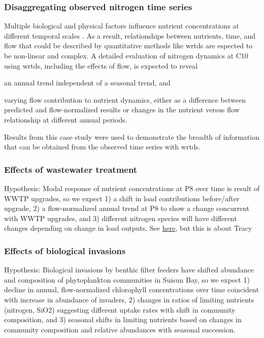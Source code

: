\documentclass[letterpaper,12pt,oneside]{article}\usepackage[]{graphicx}\usepackage[]{color}
\begin{document}
\subsubsection{Disaggregating observed nitrogen time series}

Multiple biological and physical factors influence nutrient concentrations at different temporal scales \citep[][, references therein]{Cloern10}.  As a result, relationships between nutrients, time, and flow that could be described by quantitative methods like \ac{wrtds} are espected to be non-linear and complex.  A detailed evaluation of nitrogen dynamics at C10 using \ac{wrtds}, including the effects of flow, is expected to reveal \begin{inparaenum}[1\upshape)]
\item an annual trend independent of a seasonal trend, and 
\item varying flow contribution to nutrient dynamics, either as a difference between predicted and flow-normalized results or changes in the nutrient versus flow relationship at different annual periods.
\end{inparaenum}
Results from this case study were used to demonstrate the breadth of information that can be obtained from the observed time series with \ac{wrtds}. 

\subsubsection{Effects of wastewater treatment}

Hypothesis: Modal response of nutrient concentrations at P8 over time is result of WWTP upgrades, so we expect 1) a shift in load contributions before/after upgrade, 2) a flow-normalized annual trend at P8 to show a change concurrent with WWTP upgrades, and 3) different nitrogen species will have different changes depending on change in load outputs. See \href{http://www.waterboards.ca.gov/centralvalley/board_decisions/adopted_orders/san_joaquin/r5-2008-0086_res.pdf}{here}, but this is about Tracy
\subsubsection{Effects of biological invasions}

Hypothesis: Biological invasions by benthic filter feeders have shifted abundance and composition of phytoplankton communities in Suisun Bay, so we expect 1) decline in annual, flow-normalized chlorophyll concentrations over time coincident with increase in abundance of invaders, 2) changes in ratios of limiting nutrients (nitrogen, SiO2) suggesting different uptake rates with shift in community composition, and 3) seasonal shifts in limiting nutrients based on changes in community composition and relative abundances with seasonal succession.
\end{document}
